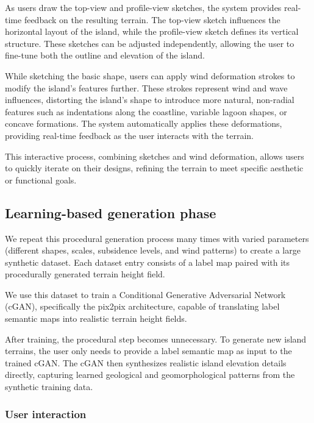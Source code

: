 As users draw the top-view and profile-view sketches, the system provides real-time feedback on the resulting terrain. The top-view sketch influences the horizontal layout of the island, while the profile-view sketch defines its vertical structure. These sketches can be adjusted independently, allowing the user to fine-tune both the outline and elevation of the island.

While sketching the basic shape, users can apply wind deformation strokes to modify the island's features further. These strokes represent wind and wave influences, distorting the island's shape to introduce more natural, non-radial features such as indentations along the coastline, variable lagoon shapes, or concave formations. The system automatically applies these deformations, providing real-time feedback as the user interacts with the terrain.

This interactive process, combining sketches and wind deformation, allows users to quickly iterate on their designs, refining the terrain to meet specific aesthetic or functional goals.



\subsection{Learning-based generation phase}
\label{sec:coral-island_cGAN-phase}

We repeat this procedural generation process many times with varied parameters (different shapes, scales, subsidence levels, and wind patterns) to create a large synthetic dataset. Each dataset entry consists of a label map paired with its procedurally generated terrain height field.

We use this dataset to train a Conditional Generative Adversarial Network (cGAN), specifically the pix2pix architecture, capable of translating label semantic maps into realistic terrain height fields.

After training, the procedural step becomes unnecessary. To generate new island terrains, the user only needs to provide a label semantic map as input to the trained cGAN. The cGAN then synthesizes realistic island elevation details directly, capturing learned geological and geomorphological patterns from the synthetic training data.

\subsubsection*{User interaction}
\label{sec:coral-island_cGAN-phase-interaction}

